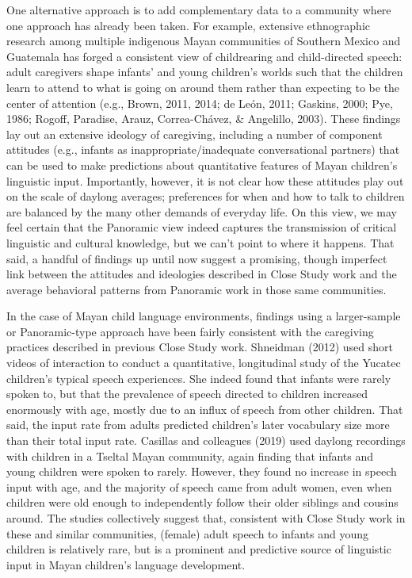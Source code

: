 \documentclass[,man,floatsintext]{apa6}
\begin{document}
One alternative approach is to add complementary data to a community
where one approach has already been taken. For example, extensive
ethnographic research among multiple indigenous Mayan communities of
Southern Mexico and Guatemala has forged a consistent view of
childrearing and child-directed speech: adult caregivers shape infants'
and young children's worlds such that the children learn to attend to
what is going on around them rather than expecting to be the center of
attention (e.g., Brown, 2011, 2014; de León, 2011; Gaskins, 2000; Pye,
1986; Rogoff, Paradise, Arauz, Correa-Chávez, \& Angelillo, 2003). These
findings lay out an extensive ideology of caregiving, including a number
of component attitudes (e.g., infants as inappropriate/inadequate
conversational partners) that can be used to make predictions about
quantitative features of Mayan children's linguistic input. Importantly,
however, it is not clear how these attitudes play out on the scale of
daylong averages; preferences for when and how to talk to children are
balanced by the many other demands of everyday life. On this view, we
may feel certain that the Panoramic view indeed captures the
transmission of critical linguistic and cultural knowledge, but we can't
point to where it happens. That said, a handful of findings up until now
suggest a promising, though imperfect link between the attitudes and
ideologies described in Close Study work and the average behavioral
patterns from Panoramic work in those same communities.

In the case of Mayan child language environments, findings using a
larger-sample or Panoramic-type approach have been fairly consistent
with the caregiving practices described in previous Close Study work.
Shneidman (2012) used short videos of interaction to conduct a
quantitative, longitudinal study of the Yucatec children's typical
speech experiences. She indeed found that infants were rarely spoken to,
but that the prevalence of speech directed to children increased
enormously with age, mostly due to an influx of speech from other
children. That said, the input rate from adults predicted children's
later vocabulary size more than their total input rate. Casillas and
colleagues (2019) used daylong recordings with children in a Tseltal
Mayan community, again finding that infants and young children were
spoken to rarely. However, they found no increase in speech input with
age, and the majority of speech came from adult women, even when
children were old enough to independently follow their older siblings
and cousins around. The studies collectively suggest that, consistent
with Close Study work in these and similar communities, (female) adult
speech to infants and young children is relatively rare, but is a
prominent and predictive source of linguistic input in Mayan children's
language development.
\end{document}
